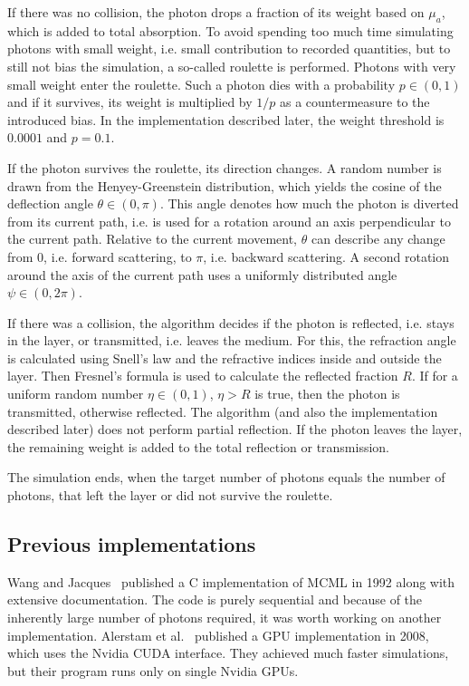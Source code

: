 \documentclass[]{article}
\begin{document}
If there was no collision, the photon drops a fraction of its weight based on $\mu_a$, which is added to total absorption. To avoid spending too much time simulating photons with small weight, i.e. small contribution to recorded quantities, but to still not bias the simulation, a so-called roulette is performed. Photons with very small weight enter the roulette. Such a photon dies with a probability $p \in (0,1)$ and if it survives, its weight is multiplied by $1/p$ as a countermeasure to the introduced bias. In the implementation described later, the weight threshold is $0.0001$ and $p=0.1$.

If the photon survives the roulette, its direction changes. A random number is drawn from the Henyey-Greenstein distribution, which yields the cosine of the deflection angle $\theta \in (0, \pi)$. This angle denotes how much the photon is diverted from its current path, i.e. is used for a rotation around an axis perpendicular to the current path. Relative to the current movement, $\theta$ can describe any change from $0$, i.e. forward scattering, to $\pi$, i.e. backward scattering. A second rotation around the axis of the current path uses a uniformly distributed angle $\psi \in (0, 2\pi)$.

If there was a collision, the algorithm decides if the photon is reflected, i.e. stays in the layer, or transmitted, i.e. leaves the medium. For this, the refraction angle is calculated using Snell's law and the refractive indices inside and outside the layer. Then Fresnel's formula is used to calculate the reflected fraction $R$. If for a uniform random number $\eta \in (0,1)$, $\eta > R$ is true, then the photon is transmitted, otherwise reflected. The algorithm (and also the implementation described later) does not perform partial reflection. If the photon leaves the layer, the remaining weight is added to the total reflection or transmission.

The simulation ends, when the target number of photons equals the number of photons, that left the layer or did not survive the roulette.

\subsection{Previous implementations}

Wang and Jacques~\cite{wang1992monte} published a C implementation of MCML in 1992 along with extensive documentation. The code is purely sequential and because of the inherently large number of photons required, it was worth working on another implementation. Alerstam et al.~\cite{alerstam2008parallel} published a GPU implementation in 2008, which uses the Nvidia CUDA interface. They achieved much faster simulations, but their program runs only on single Nvidia GPUs.
\end{document}
